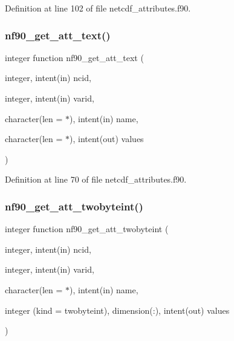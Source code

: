 Definition at line 102 of file netcdf\+\_\+attributes.\+f90.

\mbox{\label{netcdf__attributes_8f90_a5acc2fbd09dfc89f50df32aea2ee5d53}} 
\subsubsection{\texorpdfstring{nf90\+\_\+get\+\_\+att\+\_\+text()}{nf90\_get\_att\_text()}}
{\footnotesize\ttfamily integer function nf90\+\_\+get\+\_\+att\+\_\+text (\begin{DoxyParamCaption}\item[{integer, intent(in)}]{ncid,  }\item[{integer, intent(in)}]{varid,  }\item[{character(len = $\ast$), intent(in)}]{name,  }\item[{character(len = $\ast$), intent(out)}]{values }\end{DoxyParamCaption})}



Definition at line 70 of file netcdf\+\_\+attributes.\+f90.

\mbox{\label{netcdf__attributes_8f90_a46f84b604d2ff5dcaaf504748d700658}} 
\subsubsection{\texorpdfstring{nf90\+\_\+get\+\_\+att\+\_\+twobyteint()}{nf90\_get\_att\_twobyteint()}}
{\footnotesize\ttfamily integer function nf90\+\_\+get\+\_\+att\+\_\+twobyteint (\begin{DoxyParamCaption}\item[{integer, intent(in)}]{ncid,  }\item[{integer, intent(in)}]{varid,  }\item[{character(len = $\ast$), intent(in)}]{name,  }\item[{integer (kind = twobyteint), dimension(\+:), intent(out)}]{values }\end{DoxyParamCaption})}



